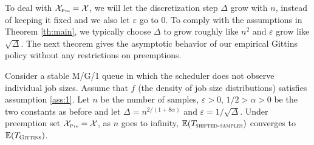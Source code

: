 \documentclass[11pt]{article}
\renewcommand{\epsilon}{\varepsilon}
\newcommand{\N}{\mathbb{N}}
\newcommand{\cX}{\mathcal{X}}
\newcommand{\XP}{\mathcal{X}_{\mbox{\tiny Pre}}}
\begin{document}
  To deal with 
  $\XP = \cX$, we will let the discretization step $\Delta$ grow with $n$, instead of keeping it fixed and we also let $\epsilon$ go to $0$.
  To comply with the assumptions in Theorem \ref{th:main}, we typically choose $\Delta$ to grow roughly  like $ n^{2}$ and $\epsilon$ grow like $\sqrt{\Delta}$.
  The next theorem gives  the asymptotic behavior of our empirical Gittins policy without any restrictions on preemptions.



  
  
\begin{theorem}
    Consider a stable M/G/1 queue in which the scheduler does not observe individual
    job sizes. Assume that $f$ (the density of job size distributions) satisfies assumption \ref{ass:1}. Let $n$ be the number of samples, $\epsilon >0$, $1/2 > \alpha >0$ be the two constants as before and let  $ \Delta = n^{2/(1+8\alpha)}$ and $\epsilon = 1/\sqrt{\Delta}$. Under preemption set $\XP = \cX$, as $n$ goes to infinity, 
     $  \mathbb{E}(T_{\textsc{shifted-samples}})$ converges to 
       $ \mathbb{E}(T_{\textsc{Gittins}})$.
\end{theorem}
\end{document}
